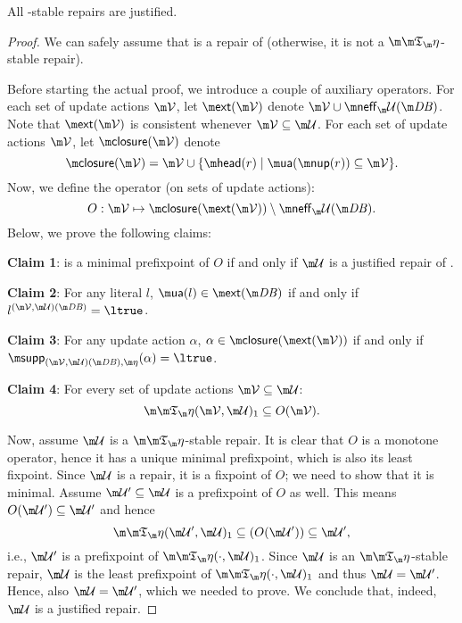 \begin{proposition}\label{prop:stable_is_justified}
All \Ap-stable repairs are justified. 
\end{proposition}
\begin{proof}
We can safely assume that \UU is a repair of \db (otherwise, it is not a $\Ap$-stable repair).

 Before starting the actual proof, we introduce a couple of auxiliary operators. 
 For each set of update actions $\VV$, let $\ext(\VV)$ denote $\VV\cup \neff_\UU(\db)$.
 Note that $\ext(\VV)$ is consistent whenever $\VV\subseteq\UU$.
 For each set of update actions $\VV$, let $\closure(\VV)$ denote \[\closure(\VV)= \VV\cup \{\head(r) \mid \actof(\nup(r)) \subseteq \VV\}.\] 
 Now, we define the operator (on sets of update actions):
\[O: \VV \mapsto \closure(\ext(\VV)) \setminus \neff_\UU(\db).\]
Below, we prove the following claims:
\begin{compactdesc}
 \item \textbf{Claim 1}: \UU is a minimal prefixpoint of $O$ if and only if $\UU$ is a justified repair of \fulldb. 
 \item \textbf{Claim 2}: For any literal $l$, $\actof(l)\in \ext(\db)$ if and only if $l^{( \VV, \UU)(\db)} = \ltrue$. 
 \item \textbf{Claim 3}: For any update action $\alpha$, $\alpha\in \closure(\ext(\VV))$ if and only if  $\supp_{(\VV,\UU)(\db),\aics}(\alpha) = \ltrue$. 
 \item \textbf{Claim 4}: For every set of update actions $\VV\subseteq \UU$: 
 \[\Ap(\VV,\UU)_1\subseteq O(\VV).\] 
\end{compactdesc}
Now, assume $\UU$ is a $\Ap$-stable repair. It is clear that $O$ is a monotone operator, hence it has a unique minimal prefixpoint, which is also its least fixpoint. Since $\UU$ is a repair, it is a fixpoint of $O$; we need to show that it is minimal. Assume $\UU'\subseteq \UU$ is a prefixpoint of $O$ as well. This means $O(\UU')\subseteq \UU'$ 
and hence 
\[\Ap({\UU'},\UU)_1 \subseteq {(O(\UU'))}\subseteq {\UU'},\]
i.e., ${\UU'}$ is a prefixpoint of $\Ap(\cdot,\UU)_1$. 
Since $\UU$ is an $\Ap$-stable repair, $\UU$ is the least prefixpoint of $\Ap(\cdot,\UU)_1$ and thus $\UU = {\UU'}$. Hence, also $\UU=\UU'$, which we needed to prove. We conclude that, indeed, $\UU$ is a justified repair. 



\end{proof}
